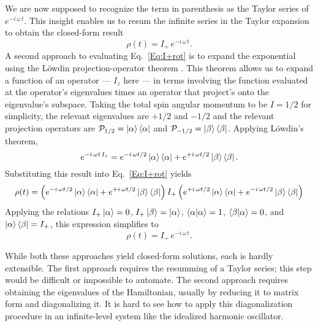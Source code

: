 We are now supposed to recognize the term in parenthesis as the Taylor series of $e^{-i \, \omega \, t}$.  This insight enables us to resum the infinite series in the Taylor expansion to obtain the closed-form result
\begin{equation}
\rho(t) = I_{+} \, e^{-i \, \omega \, t}.
\end{equation}   
A second approach to evaluating Eq.~\ref{Eq:I+rot} is to expand the exponential using the L\"{o}wdin projection-operator theorem \cite{Lowdin1955mar}.  This theorem allows us to expand a function of an operator --- $I_z$ here --- in terms involving the function evaluated at the operator's eigenvalues times an operator that project's onto the eigenvalue's subspace.  Taking the total spin angular momentum to be $I = 1/2$ for simplicity, the relevant eigenvalues are $+1/2$ and $-1/2$ and the relevant projection operators are ${\cal P}_{1/2} = \ket{\alpha}\bra{\alpha}$ and ${\cal P}_{-1/2} = \ket{\beta}\bra{\beta}$.  Applying L\"{o}wdin's theorem,
\begin{equation}
e^{-i \, \omega t \, I_z} 
	= e^{-i \, \omega t / 2} \ket{\alpha}\bra{\alpha}
	+ e^{+i \, \omega t / 2} \ket{\beta}\bra{\beta}.
\end{equation}
Substituting this result into Eq.~\ref{Eq:I+rot} yields
\[
\rho(t) = \left( e^{-i \, \omega t / 2} \ket{\alpha}\bra{\alpha}
	+ e^{+i \, \omega t / 2} \ket{\beta}\bra{\beta} \right)
	I_{+} \left( e^{+i \, \omega t / 2} \ket{\alpha}\bra{\alpha}
	+ e^{-i \, \omega t / 2} \ket{\beta}\bra{\beta} \right)
\]
Applying the relations $I_{+} \ket{\alpha} = 0$, $I_{+} \ket{\beta} = \ket{\alpha}$, $\braket{\alpha|\alpha} = 1$, $\braket{\beta|\alpha} = 0$, and $\ket{\alpha} \bra{\beta} = I_{+}$, this expression simplifies to
\begin{equation}
\rho(t) = I_{+} \, e^{-i \, \omega \, t}.
\end{equation} 

While both these approaches yield closed-form solutions, each is hardly extensible.  The first approach requires the resumming of a Taylor series; this step would be difficult or impossible to automate.  The second approach requires obtaining the eigenvalues of the Hamiltonian, usually by reducing it to matrix form and diagonalizing it.  It is hard to see how to apply this diagonalization procedure in an infinite-level system like the idealized harmonic oscillator. 

